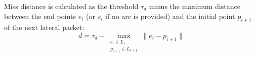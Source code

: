 Miss distance is calculated as the threshold $\tau_d$ minus the maximum distance between the end points $e_i$ (or $s_i$ if no arc is provided) and the initial point $p_{i+1}$ of the next lateral packet:
\begin{equation*}
  d = \tau_d - \max\limits_{\substack{e_i \in L_i\\p_{i+1} \in L_{i+1}}}\lVert e_i - p_{i+1} \rVert
\end{equation*}


